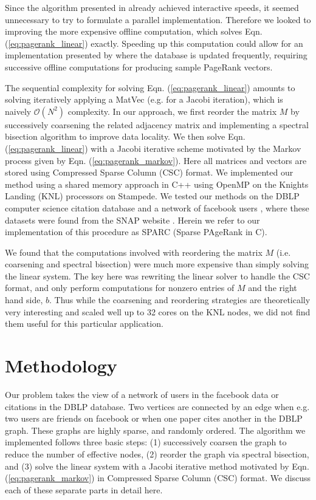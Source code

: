\documentclass[11pt]{article}
\begin{document}
Since the algorithm presented in \cite{xie} already achieved interactive speeds, it seemed
unnecessary to try to formulate a parallel implementation. Therefore we looked
to improving the more expensive offline computation, which solves Eqn.
(\ref{eq:pagerank_linear}) exactly. Speeding up this computation could allow for
an implementation presented by \cite{xie} where the database is updated
frequently, requiring successive offline computations for producing sample
PageRank vectors.

The sequential complexity for solving Eqn. (\ref{eq:pagerank_linear}) amounts to
solving iteratively applying a MatVec (e.g. for a Jacobi iteration), which is
naively $\mathcal{O}(N^2)$ complexity. In our approach, we first reorder the
matrix $M$ by successively coarsening the related adjacency matrix and
implementing a spectral bisection algorithm to improve data locality. We then
solve Eqn. (\ref{eq:pagerank_linear}) with a Jacobi iterative scheme motivated
by the Markov process given by Eqn. (\ref{eq:pagerank_markov}). Here all
matrices and vectors are stored using Compressed Sparse Column (CSC) format. We
implemented our method using a shared memory approach in C++ using OpenMP on the Knights Landing (KNL) processors on
Stampede. We tested our methods on the DBLP computer science citation database
\cite{dblp} and a network of facebook users \cite{facebook}, where these
datasets were found from the SNAP website \cite{snapnets}. Herein we refer to
our implementation of this procedure as {\rm SPARC} (Sparse PAgeRank in C).

We found that the computations involved with reordering the matrix $M$ (i.e.
coarsening and spectral bisection) were much more expensive than simply solving
the linear system. The key here was rewriting the linear solver to handle the
CSC format, and only perform computations for nonzero entries of $M$ and the right hand
side, $b$. Thus while the coarsening and reordering strategies are theoretically
very interesting and scaled well up to 32 cores on the KNL nodes, 
we did not find them useful for this particular application. 



\section{Methodology}

Our problem takes the view of a network of users in the facebook data or
citations in the DBLP database. Two vertices are connected by an edge when e.g. two
users are friends on facebook or when one paper cites another in the DBLP graph.
These graphs are highly sparse, and randomly ordered.
The algorithm we implemented follows three basic steps: (1) successively coarsen
the graph to reduce the number of effective nodes, (2) reorder the graph via
spectral bisection, and (3) solve the linear system with a Jacobi iterative
method motivated by Eqn. (\ref{eq:pagerank_markov}) in Compressed Sparse
Column (CSC) format. We discuss each of these separate parts in detail here. 
\end{document}
